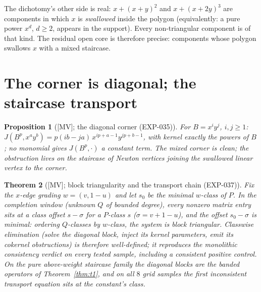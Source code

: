 \documentclass[11pt]{article}
\newtheorem{theorem}{Theorem}[section]
\newtheorem{proposition}[theorem]{Proposition}
\theoremstyle{remark}
\begin{document}
The dichotomy's other side is real: $x + (x+y)^2$ and $x + (x+2y)^3$ are components in which
$x$ is \emph{swallowed} inside the polygon (equivalently: a pure power $x^d$, $d \ge 2$,
appears in the support). Every non-triangular component is of that kind. The residual open
core is therefore precise: components whose polygon swallows $x$ with a mixed staircase.

\section{The corner is diagonal; the staircase transport}\label{sec:staircase}

\begin{proposition}[{[MV]}; the diagonal corner (EXP-035)]
For $B = x^i y^j$, $i, j \ge 1$:
$J(B^p, x^a y^b) = p (ib - ja)\, x^{ip + a - 1} y^{jp + b - 1}$, with kernel exactly the
powers of $B$; no monomial gives $J(B^p, \cdot)$ a constant term. The mixed corner is clean;
the obstruction lives on the staircase of Newton vertices joining the swallowed linear
vertex to the corner.
\end{proposition}

\begin{theorem}[{[MV]}; block triangularity and the transport chain (EXP-037)]
\label{thm:transport}
Fix the $x$-edge grading $w = (v, 1-u)$ and let $s_0$ be the minimal $w$-class of $P$. In
the completion window (unknown $Q$ of bounded degree), every nonzero matrix entry sits at a
class offset $s - \sigma$ for a $P$-class $s$ ($\sigma = v + 1 - u$), and the offset
$s_0 - \sigma$ is minimal: ordering $Q$-classes by $w$-class, the system is block
triangular. Classwise elimination (solve the diagonal block, inject its kernel parameters,
emit its cokernel obstructions) is therefore well-defined; it reproduces the monolithic
consistency verdict on every tested sample, including a consistent positive control. On the
pure above-weight staircase family the diagonal blocks are the banded operators of
Theorem~\ref{thm:t1}, and on all $8$ grid samples the first inconsistent transport equation
sits at the \emph{constant's} class.
\end{theorem}
\end{document}
